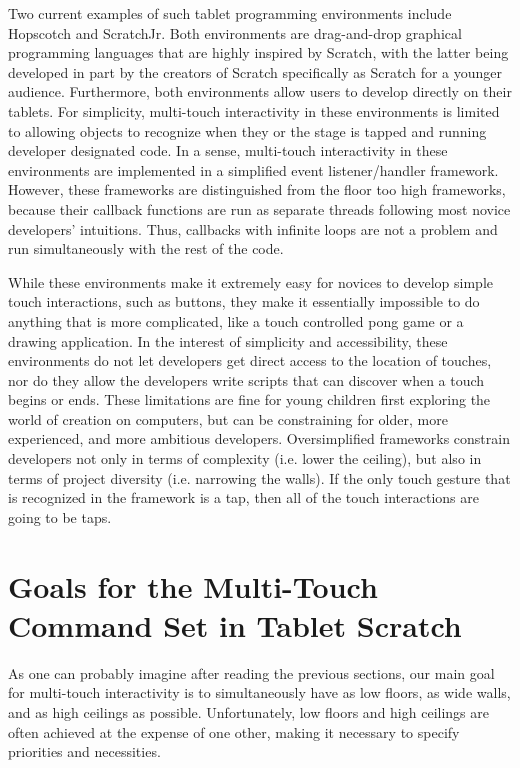 Two current examples of such tablet programming environments include Hopscotch and ScratchJr. Both environments are drag-and-drop graphical programming languages that are highly inspired by Scratch, with the latter being developed in part by the creators of Scratch specifically as Scratch for a younger audience. Furthermore, both environments allow users to develop directly on their tablets. For simplicity, multi-touch interactivity in these environments is limited to allowing objects to recognize when they or the stage is tapped and running developer designated code. In a sense, multi-touch interactivity in these environments are implemented in a simplified event listener/handler framework. However, these frameworks are distinguished from the floor too high frameworks, because their callback functions are run as separate threads following most novice developers' intuitions. Thus, callbacks with infinite loops are not a problem and run simultaneously with the rest of the code.

While these environments make it extremely easy for novices to develop simple touch interactions, such as buttons, they make it essentially impossible to do anything that is more complicated, like a touch controlled pong game or a drawing application. In the interest of simplicity and accessibility, these environments do not let developers get direct access to the location of touches, nor do they allow the developers write scripts that can discover when a touch begins or ends. These limitations are fine for young children first exploring the world of creation on computers, but can be constraining for older, more experienced, and more ambitious developers. Oversimplified frameworks constrain developers not only in terms of complexity (i.e. lower the ceiling), but also in terms of project diversity (i.e. narrowing the walls). If the only touch gesture that is recognized in the framework is a tap, then all of the touch interactions are going to be taps.

\section{Goals for the Multi-Touch Command Set in Tablet Scratch}
As one can probably imagine after reading the previous sections, our main goal for multi-touch interactivity is to simultaneously have as low floors, as wide walls, and as high ceilings as possible. Unfortunately, low floors and high ceilings are often achieved at the expense of one other, making it necessary to specify priorities and necessities. 

